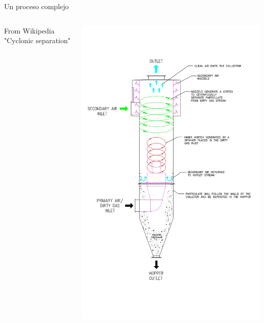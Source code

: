 \documentclass[presentation,aspectratio=169]{beamer}
\begin{document}
\begin{frame}[label={sec:orgf80547f}]{Un proceso complejo}
\begin{columns}
\begin{column}{0.6\columnwidth}
From Wikipedia "Cyclonic separation"
\end{column}
\begin{column}{0.4\columnwidth}
\begin{center}
\includegraphics[height=1.0\textheight]{../../figures/Vertical-cyclone.jpg}
\end{center}
\end{column}
\end{columns}
\end{frame}
\end{document}
